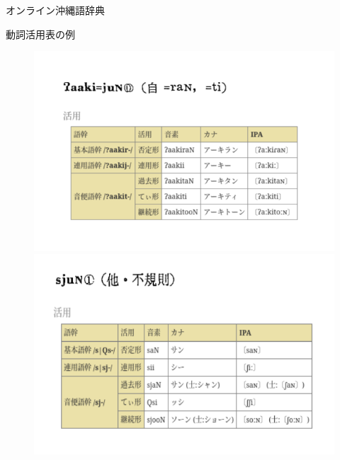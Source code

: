 \documentclass[14pt]{beamer}
\begin{document}
\begin{frame}{オンライン沖縄語辞典}
  \begin{block}{動詞活用表の例}
    \begin{figure}[ht]
      \centering
      \begin{minipage}{0.4\paperwidth}
        \includegraphics[height=0.36\paperheight]{verb-conugation-comparison.png}
      \end{minipage}%
      \begin{minipage}{0.4\textwidth}
        \includegraphics[height=0.34\paperheight]{verb-conjugation-comparison-2.png}
      \end{minipage}
    \end{figure}
  \end{block}
\end{frame}
\end{document}
